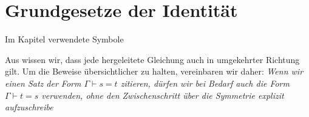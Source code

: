 \documentclass[main.tex]{subfiles}
\begin{document}
\section{Grundgesetze der Identität}
\begin{DeltaContext}{Im Kapitel verwendete Symbole}
\end{DeltaContext}

\begin{tabproof}
\end{tabproof}
\begin{remark}
  Aus  wissen wir, dass jede
  hergeleitete Gleichung auch in umgekehrter Richtung gilt.
  Um die Beweise übersichtlicher zu halten, vereinbaren wir daher:
  \emph{Wenn wir einen Satz der Form \(\Gamma \vdash s = t\) zitieren,
  dürfen wir bei Bedarf auch die Form \(\Gamma \vdash t = s\) verwenden,
  ohne den Zwischenschritt über die Symmetrie explizit aufzuschreibe}
\end{remark}

\begin{tabproof}
\end{tabproof}

\begin{tabproof}
\end{tabproof}

\begin{tabproof}
\end{tabproof}

\begin{tabproof}
\end{tabproof}
\end{document}
